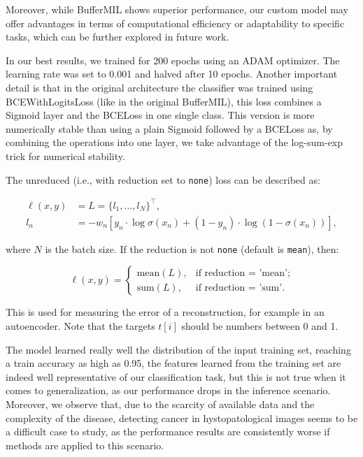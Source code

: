\documentclass[10pt,twocolumn]{article}
\begin{document}
Moreover, while BufferMIL shows superior performance, our custom model may offer advantages in terms of computational efficiency or adaptability to specific tasks, which can be further explored in future work.


In our best results, we trained for 200 epochs using an ADAM optimizer. The learning rate was set to 0.001 and halved after 10 epochs. Another important detail is that in the original architecture the classifier was trained using BCEWithLogitsLoss (like in the original BufferMIL), this loss combines a Sigmoid layer and the BCELoss in one single class. This version is more numerically stable than using a plain Sigmoid followed by a BCELoss as, by combining the operations into one layer, we take advantage of the log-sum-exp trick for numerical stability.

The unreduced (i.e., with reduction set to \texttt{none}) loss can be described as:

\begin{align*}
\ell(x, y) &= L = \{l_1, \dots, l_N\}^\top, \\
l_n &= -w_n \left[ y_n \cdot \log \sigma(x_n) 
+ (1 - y_n) \cdot \log (1 - \sigma(x_n)) \right],
\end{align*}

where \( N \) is the batch size. If the reduction is not \texttt{none} (default is \texttt{mean}), then:

\[
\ell(x, y) = 
\begin{cases}
\text{mean}(L), & \text{if reduction = 'mean'}; \\
\text{sum}(L), & \text{if reduction = 'sum'}.
\end{cases}
\]

This is used for measuring the error of a reconstruction, for example in an autoencoder. Note that the targets \( t[i] \) should be numbers between 0 and 1.


The model learned really well the distribution of the input training set, reaching a train accuracy as high as 0.95, the features learned from the training set are indeed well representative of our classification task, but this is not true when it comes to generalization, as our performance drops in the inference scenario. Moreover, we observe that, due to the scarcity of available data and the complexity of the disease, detecting cancer in hystopatological images seems to be a difficult case to study, as the performance results are consistently worse if methods are applied to this scenario.
\end{document}
